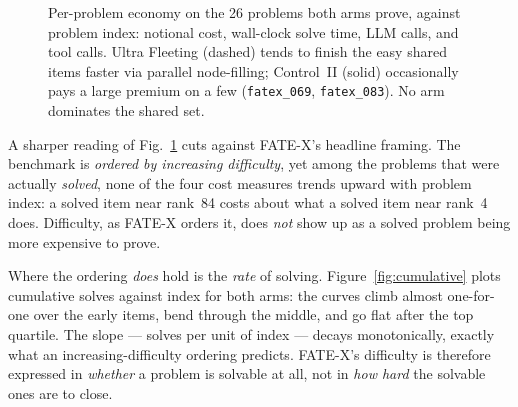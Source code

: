 \documentclass[12pt, a4paper]{article}
\newcommand{\run}[1]{\texttt{#1}}
\begin{document}
\begin{figure}[H]
\caption{Per-problem economy on the 26 problems both arms prove, against
problem index: notional cost, wall-clock solve time, LLM calls, and tool calls.
Ultra Fleeting (dashed) tends to finish the easy shared items faster via
parallel node-filling; Control~II (solid) occasionally pays a large premium on a
few (\run{fatex\_069}, \run{fatex\_083}). No arm dominates the shared set.}
\label{fig:paired}
\end{figure}

A sharper reading of Fig.~\ref{fig:paired} cuts against FATE-X's headline
framing. The benchmark is \emph{ordered by increasing difficulty}, yet among the
problems that were actually \emph{solved}, none of the four cost measures trends
upward with problem index: a solved item near rank~84 costs about what a solved
item near rank~4 does. Difficulty, as FATE-X orders it, does \emph{not} show up
as a solved problem being more expensive to prove.

Where the ordering \emph{does} hold is the \emph{rate} of solving.
Figure~\ref{fig:cumulative} plots cumulative solves against index for both arms:
the curves climb almost one-for-one over the early items, bend through the
middle, and go flat after the top quartile. The slope --- solves per unit of
index --- decays monotonically, exactly what an increasing-difficulty ordering
predicts. FATE-X's difficulty is therefore expressed in \emph{whether} a problem
is solvable at all, not in \emph{how hard} the solvable ones are to close.
\end{document}
